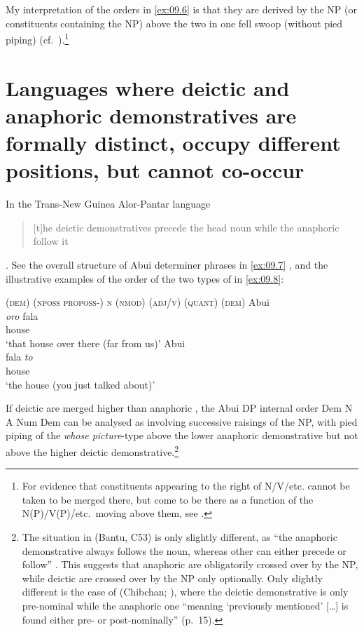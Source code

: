 \documentclass[output=paper]{langsci/langscibook}
\begin{document}
My interpretation of the orders in \eqref{ex:09.6} is that they are derived
by  the NP (or constituents containing the NP) above the two
 in one fell swoop (without pied piping)
(cf.\ \citealt{Cinque2005,Cinque2017}).\footnote{For evidence that constituents
appearing to the right of N/V/etc. cannot be taken to be merged there, but come
to be there as a function of the N(P)/V(P)/etc.\ moving above them, see
\citet{Cinque2009}.}

\section{Languages where deictic and anaphoric demonstratives are formally
distinct, occupy different positions, but cannot co-occur}

In the Trans-New Guinea Alor-Pantar language 
\parencites[§3.5.2]{Kratochvil2007}{Kratochvil2011} \blockquote{[t]he deictic
demonstratives precede the head noun while the anaphoric  follow
it} \parencite[156]{Kratochvil2007}. See the overall structure of Abui
determiner phrases in \eqref{ex:09.7} \parencite[156]{Kratochvil2007}, and the illustrative
examples of the order of the two types of  in \eqref{ex:09.8}:

\ea\label{ex:09.7}
(\textsc{dem}) \textsc{(nposs proposs-) n (nmod) (adj/v) (quant)} (\textsc{dem})
\ex\label{ex:09.8}
	\ea Abui \parencite[111]{Kratochvil2007}\\
		\gll \textit{oro} fala\\
			    {\Dem{}} house\\
		\glt ‘that house over there (far from us)’
	\ex Abui \parencite[114]{Kratochvil2007}\\
		\gll fala \textit{to}\\
			    house {\Dem{}}\\
		\glt ‘the house (you just talked about)’
	\z
\z

If deictic  are merged higher than anaphoric
, the Abui DP internal order Dem N A Num
Dem can be analysed as involving successive raisings
of the NP, with pied piping of the \emph{whose picture}-type
above the lower anaphoric demonstrative but not above the higher
deictic demonstrative.\footnote{The situation in 
    (Bantu, C53) is only slightly different, as \enquote{the anaphoric
    demonstrative always follows the noun, whereas other 
can either precede or follow} \parencite[§2.4]{vandeVelde2005b}. This suggests
that anaphoric  are obligatorily crossed over by the NP,
while deictic  are crossed over by the NP only
optionally. Only slightly different is the case of  (Chibchan;
\citealt[§6.6]{CraigGrinevald1988}), where the deictic demonstrative
is only pre-nominal while the anaphoric one \enquote{meaning ‘previously
mentioned’ [\dots{}] is found either pre- or post-nominally} (p.\ 15).}
\end{document}

